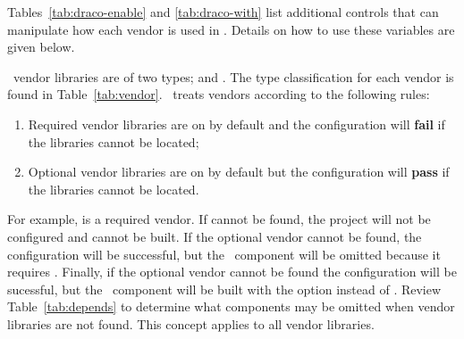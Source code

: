 Tables~\ref{tab:draco-enable} and \ref{tab:draco-with} list additional controls that can manipulate how each vendor is used in \draco.  Details on how to use
these variables are given below.

\draco\ vendor libraries are of two types;  and
.  The type classification for each vendor is found in
Table~\ref{tab:vendor}.  \draco\ treats vendors according to the
following rules:
\begin{enumerate}
\item Required vendor libraries are on by default and the configuration will {\bf fail} if the libraries cannot be located;
\item Optional vendor libraries are on by default but the configuration will {\bf pass} if the libraries cannot be located.
\end{enumerate}
For example,  is a required vendor.  If  cannot be found, the project will not be configured and  cannot be built.  If the optional vendor  cannot be found, the configuration will be successful, but the \draco\ component  will be omitted because it requires .  Finally, if the optional vendor  cannot be found the configuration will be sucessful, but the \cfour\ component will be built with the  option instead of .  Review Table~\ref{tab:depends} to determine what components may be omitted when vendor libraries are not found. This concept applies to all vendor libraries.


